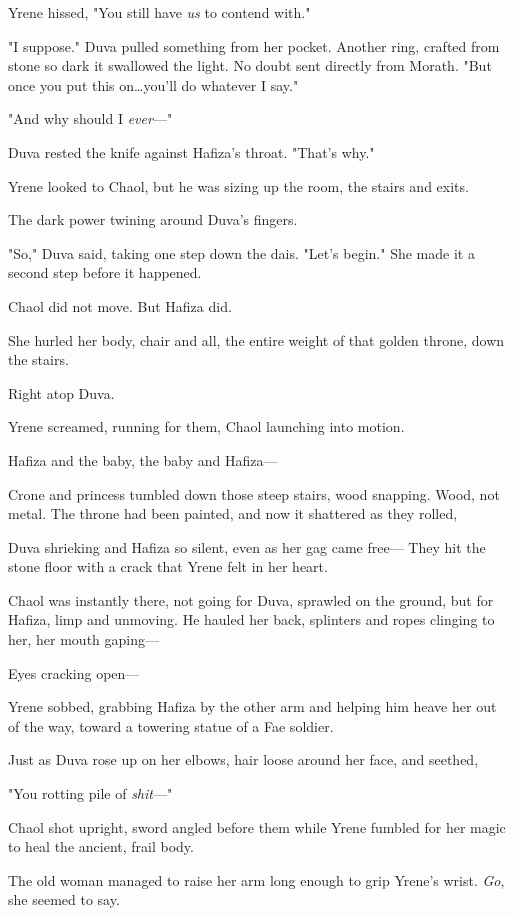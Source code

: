 Yrene hissed, "You still have \emph{us} to contend with."

"I suppose."
Duva pulled something from her pocket.
Another ring, crafted from stone so dark it swallowed the light.
No doubt sent directly from Morath.
"But once you put this on\ldots you'll do whatever I say."

"And why should I \emph{ever}---"

Duva rested the knife against Hafiza's throat.
"That's why."

Yrene looked to Chaol, but he was sizing up the room, the stairs and exits.

The dark power twining around Duva's fingers.

"So," Duva said, taking one step down the dais.
"Let's begin."
She made it a second step before it happened.

Chaol did not move.
But Hafiza did.

She hurled her body, chair and all, the entire weight of that golden throne, down the stairs.

Right atop Duva.

Yrene screamed, running for them, Chaol launching into motion.

Hafiza and the baby, the baby and Hafiza---

Crone and princess tumbled down those steep stairs, wood snapping.
Wood, not metal.
The throne had been painted, and now it shattered as they rolled,

Duva shrieking and Hafiza so silent, even as her gag came free--- They hit the stone floor with a crack that Yrene felt in her heart.

Chaol was instantly there, not going for Duva, sprawled on the ground, but for Hafiza, limp and unmoving.
He hauled her back, splinters and ropes clinging to her, her mouth gaping---

Eyes cracking open---

Yrene sobbed, grabbing Hafiza by the other arm and helping him heave her out of the way, toward a towering statue of a Fae soldier.

Just as Duva rose up on her elbows, hair loose around her face, and seethed,

"You rotting pile of \emph{shit}---"

Chaol shot upright, sword angled before them while Yrene fumbled for her magic to heal the ancient, frail body.

The old woman managed to raise her arm long enough to grip Yrene's wrist.
\emph{Go}, she seemed to say.

